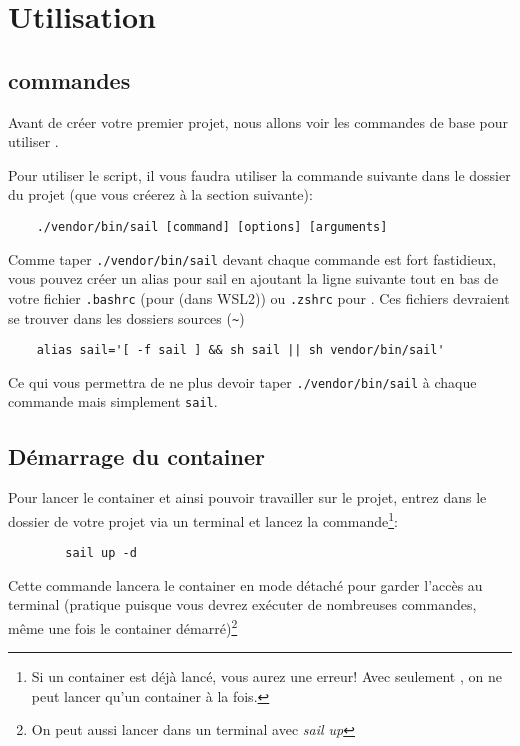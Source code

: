 \section[Utilisation]{Utilisation\label{sec:utilisation}}

\subsection[Commandes]{commandes}
Avant de créer votre premier projet, nous allons voir les commandes de base pour utiliser \laravelsail{}.

Pour utiliser le script, il vous faudra utiliser la commande suivante dans le dossier du projet (que vous créerez à la section suivante):

\begin{lstlisting}
    ./vendor/bin/sail [command] [options] [arguments]
\end{lstlisting}

Comme taper \verb|./vendor/bin/sail| devant chaque commande est fort fastidieux, vous pouvez créer un alias pour sail en ajoutant la ligne suivante tout en bas de votre fichier \verb|.bashrc| (pour \windows{} (dans WSL2)) ou \verb|.zshrc| pour \macos{}. Ces fichiers devraient se trouver dans les dossiers sources (\verb|~|)

\begin{lstlisting}
    alias sail='[ -f sail ] && sh sail || sh vendor/bin/sail'
\end{lstlisting}

Ce qui vous permettra de ne plus devoir taper \verb|./vendor/bin/sail| à chaque commande mais simplement \verb|sail|.

\subsection[Démarrage du container]{Démarrage du container}
    Pour lancer le container et ainsi pouvoir travailler sur le projet, entrez dans le dossier de votre projet via un terminal et lancez la commande\footnote{Si un container est déjà lancé, vous aurez une erreur! Avec seulement \laravelsail, on ne peut lancer qu'un container à la fois.}:
    
    \begin{lstlisting}
        sail up -d
    \end{lstlisting}

    Cette commande lancera le container en mode détaché pour garder l'accès au terminal (pratique puisque vous devrez exécuter de nombreuses commandes, même une fois le container démarré)\footnote{On peut aussi lancer dans un terminal avec \textit{sail up}}

